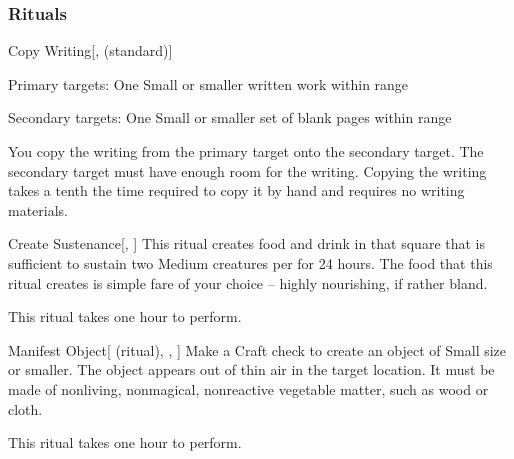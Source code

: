 \subsubsection{Rituals}


\lowercase{\hypertarget{spell:Copy Writing}{}}\label{spell:Copy Writing}
\begin{freeability}[Rank 1]{\hypertarget{spell:Copy Writing}{Copy Writing}}[,  (standard)]

Primary targets: One Small or smaller written work within \rngclose range
\par\noindent
Secondary targets: One Small or smaller set of blank pages within \rngclose range

You copy the writing from the primary target onto the secondary target.
The secondary target must have enough room for the writing.
Copying the writing takes a tenth the time required to copy it by hand and requires no writing materials.
\end{freeability}
\vspace{0.25em}



\lowercase{\hypertarget{spell:Create Sustenance}{}}\label{spell:Create Sustenance}
\begin{apability}[Rank 3]{\hypertarget{spell:Create Sustenance}{Create Sustenance}}[, ]
This ritual creates food and drink in that square that is sufficient to sustain two Medium creatures per  for 24 hours.
The food that this ritual creates is simple fare of your choice -- highly nourishing, if rather bland.

This ritual takes one hour to perform.
\end{apability}
\vspace{0.25em}



\lowercase{\hypertarget{spell:Manifest Object}{}}\label{spell:Manifest Object}
\begin{attuneability}[Rank 3]{\hypertarget{spell:Manifest Object}{Manifest Object}}[ (ritual), , ]
Make a Craft check to create an object of Small size or smaller.
The object appears out of thin air in the target location.
It must be made of nonliving, nonmagical, nonreactive vegetable matter, such as wood or cloth.

This ritual takes one hour to perform.
\end{attuneability}
\vspace{0.25em}


